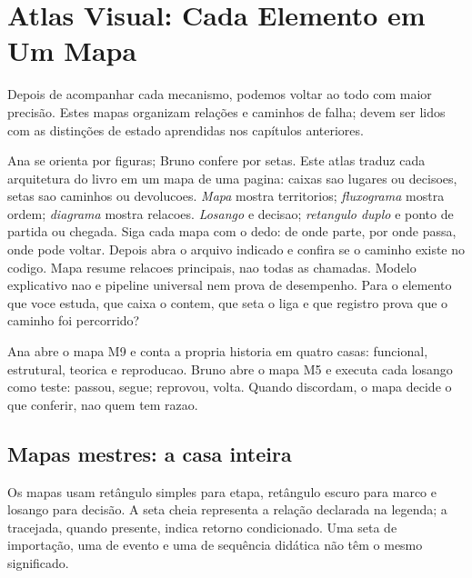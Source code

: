 \chapter{Atlas Visual: Cada Elemento em Um Mapa}

Depois de acompanhar cada mecanismo, podemos voltar ao todo com maior precisão. Estes mapas organizam relações e caminhos de falha; devem ser lidos com as distinções de estado aprendidas nos capítulos anteriores.


\roteirodidatico
{Ana se orienta por figuras; Bruno confere por setas. Este atlas traduz cada arquitetura do livro em um mapa de uma pagina: caixas sao lugares ou decisoes, setas sao caminhos ou devolucoes.}
{\emph{Mapa} mostra territorios; \emph{fluxograma} mostra ordem; \emph{diagrama} mostra relacoes. \emph{Losango} e decisao; \emph{retangulo duplo} e ponto de partida ou chegada.}
{Siga cada mapa com o dedo: de onde parte, por onde passa, onde pode voltar. Depois abra o arquivo indicado e confira se o caminho existe no codigo.}
{Mapa resume relacoes principais, nao todas as chamadas. Modelo explicativo nao e pipeline universal nem prova de desempenho.}
{Para o elemento que voce estuda, que caixa o contem, que seta o liga e que registro prova que o caminho foi percorrido?}

{Ana abre o mapa M9 e conta a propria historia em quatro casas: funcional, estrutural, teorica e reproducao. Bruno abre o mapa M5 e executa cada losango como teste: passou, segue; reprovou, volta. Quando discordam, o mapa decide o que conferir, nao quem tem razao.}

\section{Mapas mestres: a casa inteira}


\begin{descricao}
Os mapas usam retângulo simples para etapa, retângulo escuro para marco e
losango para decisão. A seta cheia representa a relação declarada na legenda;
a tracejada, quando presente, indica retorno condicionado. Uma seta de
importação, uma de evento e uma de sequência didática não têm o mesmo significado.
\end{descricao}

